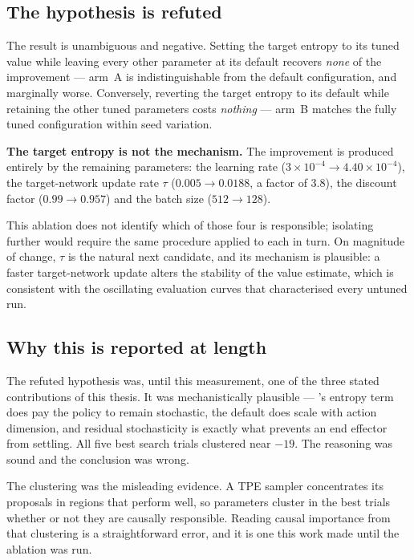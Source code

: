 \subsection*{The hypothesis is refuted}

The result is unambiguous and negative. Setting the target entropy to its tuned
value while leaving every other parameter at its default recovers \emph{none} of
the improvement --- arm~A is indistinguishable from the default configuration,
and marginally worse. Conversely, reverting the target entropy to its default
while retaining the other tuned parameters costs \emph{nothing} --- arm~B matches
the fully tuned configuration within seed variation.

\textbf{The target entropy is not the mechanism.} The improvement is produced
entirely by the remaining parameters: the learning rate ($3\times10^{-4}
\rightarrow 4.40\times10^{-4}$), the target-network update rate $\tau$
($0.005 \rightarrow 0.0188$, a factor of 3.8), the discount factor
($0.99 \rightarrow 0.957$) and the batch size ($512 \rightarrow 128$).

This ablation does not identify which of those four is responsible; isolating
further would require the same procedure applied to each in turn. On magnitude of
change, $\tau$ is the natural next candidate, and its mechanism is plausible: a
faster target-network update alters the stability of the value estimate, which is
consistent with the oscillating evaluation curves that characterised every
untuned run.

\subsection*{Why this is reported at length}

The refuted hypothesis was, until this measurement, one of the three stated
contributions of this thesis. It was mechanistically plausible --- \SAC's entropy
term does pay the policy to remain stochastic, the default does scale with action
dimension, and residual stochasticity is exactly what prevents an end effector
from settling. All five best search trials clustered near $-19$. The reasoning was
sound and the conclusion was wrong.

The clustering was the misleading evidence. A TPE sampler concentrates its
proposals in regions that perform well, so parameters cluster in the best trials
whether or not they are causally responsible. Reading causal importance from that
clustering is a straightforward error, and it is one this work made until the
ablation was run.

